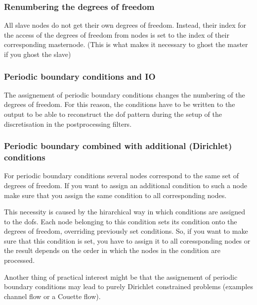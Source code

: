 \subsubsection{Renumbering the degrees of freedom}
All slave nodes do not get their own degrees of freedom. Instead, their index
for the access of the degrees of freedom from nodes is set to the index of
their corresponding masternode. (This is what makes it necessary to ghost the
master if you ghost the slave)

\subsubsection{Periodic boundary conditions and IO}
The assignement of periodic boundary conditions changes the numbering of the
degrees of freedom. For this reason, the conditions have to be written to the
output to be able to reconstruct the dof pattern during the setup of the
discretisation in the postprocessing filters.

\subsubsection{Periodic boundary combined with additional 
  (Dirichlet) conditions}
For periodic boundary conditions several nodes correspond to the same set of
degrees of freedom. If you want to assign an additional condition to such a
node make sure that you assign the same condition to all corresponding nodes.

This necessity is caused by the hirarchical way in which conditions are
assigned to the dofs. Each node belonging to this condition sets its condition
onto the degrees of freedom, overriding previously set conditions.
So, if you want to make sure that this condition is set, you have to assign it
to all coressponding nodes or the result depends on the order in which the
nodes in the condition are processed.

Another thing of practical interest might be that the assignement of periodic
boundary conditions may lead to purely Dirichlet constrained problems
(examples channel flow or a Couette flow). 
